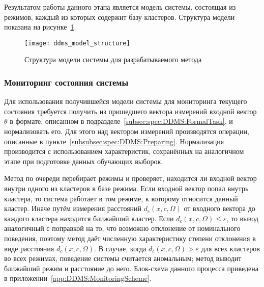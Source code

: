 Результатом работы данного этапа является модель системы, состоящая из режимов, каждый из которых содержит базу кластеров. Структура модели показана на рисунке~\ref{fig:spec:DDMS:ModelStructure}.

\begin{figure}[h]
	\texttt{[image: ddms\_model\_structure]}
	\caption{Структура модели системы для разрабатываемого метода}
	\label{fig:spec:DDMS:ModelStructure}
\end{figure}

\subsubsection{Мониторинг состояния системы}
Для использования получившейся модели системы для мониторинга текущего состояния требуется получить из пришедшего вектора измерений входной вектор $\theta$ в формате, описанном в подразделе~\ref{subsec:spec:DDMS:FormalTask}, и нормализовать его. Для этого над вектором измерений производятся операции, описанные в пункте~\ref{subsubsec:spec:DDMS:Preparing}. Нормализация производится с использованием характеристик, сохранённых на аналогичном этапе при подготовке данных обучающих выборок.

Метод по очереди перебирает режимы и проверяет, находится ли входной вектор внутри одного из кластеров в базе режима. Если входной вектор попал внутрь кластера, то система работает в том режиме, к которому относится данный кластер. Иначе путём измерения расстояний $d_c(x,c,\Omega)$ от входного вектора до каждого кластера находится ближайший кластер. Если  $d_c(x,c,\Omega) \leq \varepsilon$, то вывод аналогичный с поправкой на то, что возможно отклонение от номинального поведения, поэтому метод даёт численную характеристику степени отклонения в виде расстояния $d_c(x,c,\Omega)$. В случае, когда $d_c(x,c,\Omega) > \varepsilon$ для всех кластеров во всех режимах, поведение системы считается аномальным; метод выводит ближайший режим и расстояние до него. Блок-схема данного процесса приведена в приложении~\ref{app:DDMS:MonitoringScheme}.
